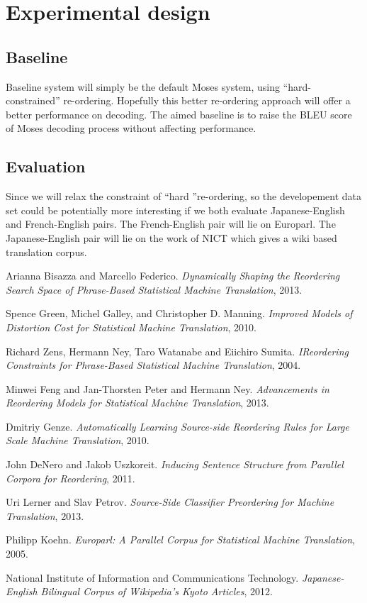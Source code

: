\documentclass[11pt]{article}
\begin{document}
\section{Experimental design} %
\label{sec:experimental_design}
\subsection{Baseline} %
\label{sub:baseline}
Baseline system will simply be the default Moses system, using ``hard-constrained'' re-ordering. Hopefully this better re-ordering approach will offer a better performance on decoding. The aimed baseline is to raise the BLEU score of Moses decoding process without affecting performance.
\subsection{Evaluation} %
\label{sub:evaluation}
Since we will relax the constraint of ``hard ''re-ordering, so the developement data set could be potentially more interesting if we both evaluate Japanese-English and French-English pairs. The French-English pair will lie on Europarl\cite{eu}. The Japanese-English pair will lie on the work of NICT which gives a wiki based translation corpus\cite{nict}.
\begin{thebibliography}{50}
 Arianna Bisazza and Marcello Federico. \textsl{Dynamically Shaping the Reordering Search Space
of Phrase-Based Statistical Machine Translation}, 2013.

 Spence Green, Michel Galley, and Christopher D. Manning. \textsl{Improved Models of Distortion Cost for Statistical Machine Translation}, 2010.

 Richard Zens, Hermann Ney, Taro Watanabe and Eiichiro Sumita. \textsl{IReordering Constraints for Phrase-Based Statistical Machine Translation}, 2004.

 Minwei Feng and Jan-Thorsten Peter and Hermann Ney. \textsl{Advancements in Reordering Models for Statistical Machine Translation}, 2013.

 Dmitriy Genze. \textsl{Automatically Learning Source-side Reordering Rules for Large Scale Machine Translation}, 2010.

 John DeNero and Jakob Uszkoreit. \textsl{Inducing Sentence Structure from Parallel Corpora for Reordering}, 2011.

 Uri Lerner and Slav Petrov. \textsl{Source-Side Classifier Preordering for Machine Translation}, 2013.

 Philipp Koehn. \textsl{Europarl: A Parallel Corpus for Statistical Machine Translation}, 2005.

 National Institute of Information and Communications Technology. \textsl{Japanese-English Bilingual Corpus of Wikipedia's Kyoto Articles}, 2012.

\end{thebibliography}
\end{document}
